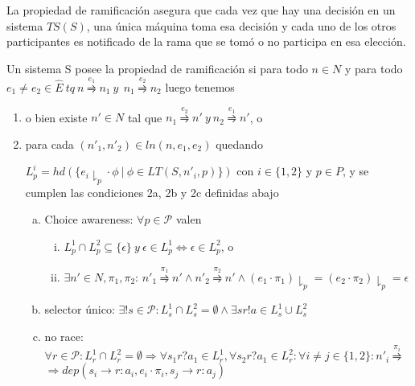 La propiedad de ramificación asegura que cada vez que hay una decisión en un sistema $TS(S)$, una única máquina toma esa decisión y cada uno de los otros participantes es notificado de la rama que se tomó o no participa en esa elección. 
 
\begin{definition}\label{def:branching} Un sistema S posee la propiedad de ramificación si para todo $n \in N$ y para todo $e_1 \neq e_2 \in \hat{E} \ \mathit{tq} \ n \overset{e_1}{\rightrightharpoons} n_1 \ \mathit{y} \  \ n_1 \overset{e_2}{\rightrightharpoons} n_2$ luego tenemos
\begin{enumerate}
\item o bien existe $n'\in N$ tal que $n_1 \overset{e_2}{\rightrightharpoons} n' \ \mathit{y} \ n_2 \overset{e_1}{\rightrightharpoons} n'$, o 
\item para cada $(n'_1, n'_2) \in ln(n, e_1, e_2)$ quedando 

$L_p^i = hd (\{e_i \downharpoonright_p \cdot \phi \  | \ \phi \in LT(S,n'_i,p) \} ) $ con $i \in \{1,2\}$ y $p \in P$, y se cumplen las condiciones 2a, 2b y 2c definidas abajo 	

\begin{enumerate}[(a)]
\item Choice awareness: $\forall p \in \mathcal{P}$ valen \begin{enumerate}[i.]
\item $L_p^1 \cap	L_p^2 \subseteq \{ \epsilon \} \ \mathit{y} \  \epsilon \in L_p^1 \iff \epsilon \in L_p^2$, o 
\item $\exists n' \in N, \pi_1, \pi_2$: $n'_1 \overset{\pi_1}{\rightrightharpoons} n' \land  n'_2 \overset{\pi_2}{\rightrightharpoons} n' \land (e_1 \cdot \pi_1) \downharpoonright_p= (e_2 \cdot \pi_2)\downharpoonright_p = \epsilon$
\end{enumerate}
\item selector único: $\exists!s \in \mathcal{P}: L_s^1 \cap L_s^2 = \emptyset \land \exists sr!a \in L_s^1 \cup L_s^2 $
\item no race: $\forall r \in \mathcal{P}: L_r^1\cap L_r^2 = \emptyset \Rightarrow \forall s_1r?a_1 \in L_r^1, \forall s_2r?a_1 \in L_r^2:\forall i \neq j \in \{1,2\}: n'_i \overset{\pi_i}\rightrightharpoons  $ \\
$\Rightarrow dep (s_i \rightarrow r: a_i, e_i \cdot \pi_i, s_j \rightarrow r: a_j) $
\end{enumerate}
\end{enumerate} 
\end{definition}

